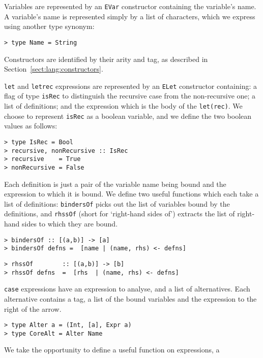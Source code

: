 Variables are represented by an \mbox{\tt EVar} constructor containing the variable's
name.  A variable's name is represented simply by a list of characters, which
we express using another type synonym:
\begin{verbatim}
> type Name = String
\end{verbatim}
%
Constructors are identified by their arity and tag, as described in
Section~\ref{sect:lang:constructors}.

\mbox{\tt let} and \mbox{\tt letrec} expressions are represented by an \mbox{\tt ELet} constructor
containing: a flag of type \mbox{\tt isRec} to
distinguish the recursive case from the non-recursive one; a list of
definitions; and the expression which is the body of the \mbox{\tt let(rec)}.
We choose to represent \mbox{\tt isRec} as a boolean variable, and we define the two
boolean values as follows:
\begin{verbatim}
> type IsRec = Bool
> recursive, nonRecursive :: IsRec
> recursive    = True
> nonRecursive = False
\end{verbatim}
%
%
%
Each definition is just a pair of the variable name being bound and the
expression to which it is bound.
We define two useful functions which each take a list of definitions:
\mbox{\tt bindersOf} picks out the list of variables bound by the definitions,
and \mbox{\tt rhssOf} (short for
`right-hand sides of') extracts the list of right-hand sides
to which they are bound.
\begin{verbatim}
> bindersOf :: [(a,b)] -> [a]
> bindersOf defns =  [name | (name, rhs) <- defns]
\end{verbatim}
%
%
\begin{verbatim}
> rhssOf        :: [(a,b)] -> [b]
> rhssOf defns  =  [rhs  | (name, rhs) <- defns]
\end{verbatim}
%
%
\mbox{\tt case} expressions have an expression to analyse, and  a list of
alternatives.  Each alternative contains a tag, a list of the bound
variables and  the expression to the right of the arrow.
\begin{verbatim}
> type Alter a = (Int, [a], Expr a)
> type CoreAlt = Alter Name
\end{verbatim}
%
%
We take the opportunity to define a useful function on expressions, a
